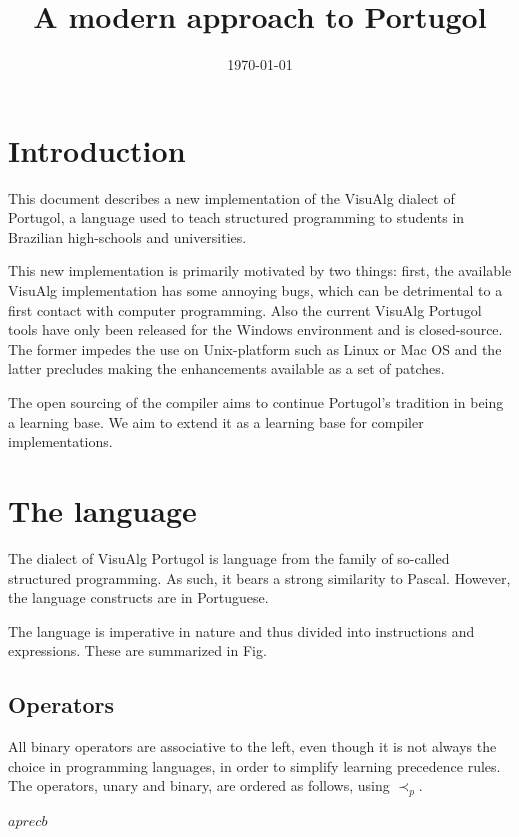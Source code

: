 \documentclass[11pt]{article}
\date{\today}
\title{A modern approach to Portugol}
\begin{document}
\maketitle
\tableofcontents


\section{Introduction}
\label{sec-1}

This document describes a new implementation of the VisuAlg dialect of Portugol,
a language used to teach structured programming to students in Brazilian
high-schools and universities.

This new implementation is primarily motivated by two things:
first, the available VisuAlg implementation has some annoying bugs, which can be
  detrimental to a first contact with computer programming.
Also the current VisuAlg Portugol tools have only been released for the Windows
environment and is closed-source. The former impedes the use on Unix-platform
such as Linux or Mac OS and the latter precludes making the enhancements
available as a set of patches.

The open sourcing of the compiler aims to continue Portugol's tradition in being
a learning base. We aim to extend it as a learning base for compiler
implementations.


\section{The language}
\label{sec-2}


The dialect of VisuAlg Portugol is language from the family of so-called
structured programming. As such, it bears a strong similarity to Pascal.
However, the language constructs are in Portuguese.

The language is imperative in nature and thus divided into instructions and
expressions. These are summarized in Fig.

\subsection{Operators}
\label{sec-2-1}

All binary operators are associative to the left, even though it is not
always the choice in programming languages, in order to simplify learning
precedence rules. The operators, unary and binary, are ordered as follows,
using $\prec_{p}$.

$a {{{prec}}} b$
\end{document}
